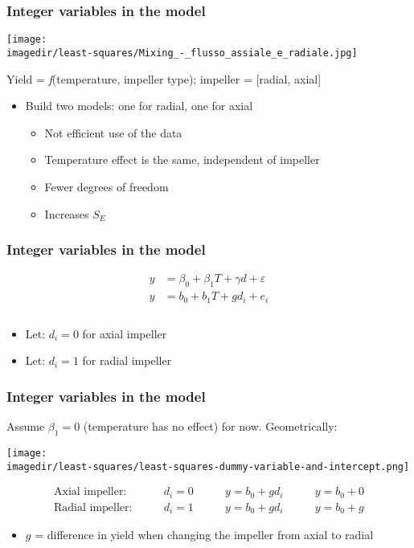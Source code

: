 \begin{frame}\frametitle{Integer variables in the model}
	\begin{center}
		\texttt{[image: \\imagedir/least-squares/Mixing\_-\_flusso\_assiale\_e\_radiale.jpg]}
	\end{center}

	Yield = \emph{f}(temperature, impeller type); impeller = [radial, axial]
	\begin{itemize}
		\item	Build two models: one for radial, one for axial
		\begin{itemize}
			\item	Not efficient use of the data
			\item	Temperature effect is the same, independent of impeller
			\item	Fewer degrees of freedom
			\item	Increases $S_E$
		\end{itemize}
	\end{itemize}
\end{frame}

\begin{frame}\frametitle{Integer variables in the model}

	$$
	\begin{array}{lr}
		y &= \beta_0 + \beta_1 T + \gamma d + \varepsilon \\
		y &= b_0 + b_1 T + g d_i + e_i \\
		\\
	\end{array}
	$$
	\begin{itemize}
		\item	Let: $d_i = 0$ for axial impeller
		\item	Let: $d_i = 1$ for radial impeller
	\end{itemize}
\end{frame}

\begin{frame}\frametitle{Integer variables in the model}

	Assume $\beta_1 = 0$ (temperature has no effect) for now. Geometrically:
	\begin{center}
		\texttt{[image: \\imagedir/least-squares/least-squares-dummy-variable-and-intercept.png]}
	\end{center}
	$$
	\begin{array}{llll}
		\text{Axial impeller:} \qquad & d_i=0 &\qquad y = b_0 + gd_i &\qquad y = b_0 + 0 \\
		\text{Radial impeller:} \qquad & d_i=1 &\qquad y = b_0 + gd_i & \qquad y = b_0 + g
	\end{array}
	$$
	\begin{itemize}
		\item	$g$ = difference in yield when changing the impeller from axial to radial
	\end{itemize}
\end{frame}

